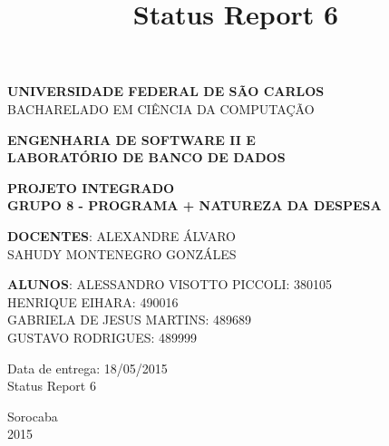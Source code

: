 \documentclass[a4paper,12pt]{article}
\title{Status Report 6}
\begin{document}
\renewcommand*\sectionmark[1]{\markboth{#1}{}}
\renewcommand*\subsectionmark[1]{\markboth{#1}{}}


\begin{titlepage}
\begin{center}
{\bf \large UNIVERSIDADE FEDERAL DE SÃO CARLOS}\\[0.2cm]
{\large BACHARELADO EM CIÊNCIA DA COMPUTAÇÃO}\\[0.2cm]

\end{center}

\vfill
\begin{center}
{\bf \large ENGENHARIA DE SOFTWARE II E\\LABORATÓRIO DE BANCO DE DADOS}\\[3.2cm]
\end{center}

\begin{center}
{\bf \LARGE PROJETO INTEGRADO}\\[0.3cm]
{\bf \Large GRUPO 8 - PROGRAMA + NATUREZA DA DESPESA}\\[2.2cm]
\end{center}

\vfill
\begin{flushright}
{\large \textbf{DOCENTES}: ALEXANDRE ÁLVARO}\\[0.2cm]
{\large SAHUDY MONTENEGRO GONZÁLES}\\[0.5cm]
\end{flushright}

\vfill
\begin{flushright}
{\large {\bf ALUNOS}: ALESSANDRO VISOTTO PICCOLI: 380105}\\[0.15cm]
{\large HENRIQUE EIHARA: 490016}\\[0.15cm]
{\large GABRIELA DE JESUS MARTINS: 489689}\\[0.15cm]
{\large GUSTAVO RODRIGUES: 489999}\\[0.15cm]
\end{flushright}

\vfill
\begin{flushright}
{\large Data de entrega: 18/05/2015}\\[0.2cm]
{\large Status Report 6}\\[2.0cm]
\end{flushright}

\begin{center}
{\large Sorocaba}\\[0.2cm]
{\large 2015}
\end{center}

\end{titlepage}
\end{document}
